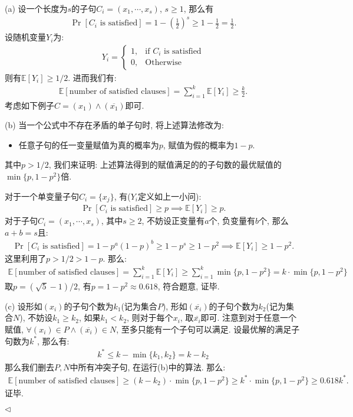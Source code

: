 \documentclass[11pt]{article}
\newenvironment{answer}[1][Solution]{\begin{trivlist}
\item[\hskip \labelsep{\bfseries#1.}\hskip \labelsep]}{\hfill$\lhd$\end{trivlist}}
\newcommand\E{\mathbb{E}}
\begin{document}
\begin{answer}
(a) 设一个长度为$s$的子句$C_i = (x_1,\cdots,x_s)$, $s\ge 1$, 那么有
\begin{align*}
    \Pr[C_i \text{ is satisfied}] = 1 - \left(\frac{1}{2}\right)^s \ge 1 - \frac{1}{2} = \frac{1}{2}.
\end{align*}
设随机变量$Y_i$为:
\begin{align*}
    Y_i = \begin{cases}
        1, & \text{if } C_i \text{ is satisfied} \\
        0, & \text{Otherwise}
    \end{cases}
\end{align*}
则有$\E[Y_i] \ge 1/2$. 进而我们有:
\begin{align*}
    \E[\text{number of satisfied clauses}] = \sum_{i=1}^k \E[Y_i] \ge \frac{k}{2}.
\end{align*}
考虑如下例子$C = (x_1)\land (\overline{x_1})$即可.

(b) 当一个公式中不存在矛盾的单子句时, 将上述算法修改为:
\begin{itemize}
    \item 任意子句的任一变量赋值为真的概率为$p$, 赋值为假的概率为$1-p$.
\end{itemize} 
其中$p > 1/2$, 我们来证明: 上述算法得到的赋值满足的的子句数的最优赋值的$\min\{p, 1-p^2\}$倍.

对于一个单变量子句$C_i = \{x_j\}$, 有($Y_i$定义如上一小问):
\begin{align*}
    \Pr[C_i \text{ is satisfied}] \ge p \implies \E[Y_i] \ge p.
\end{align*}
对于子句$C_i = (x_1,\cdots,x_s)$, 其中$s\ge 2$, 不妨设正变量有$a$个, 负变量有$b$个, 那么$a + b = s$且:
\begin{align*}
    \Pr[C_i \text{ is satisfied}] = 1 - p^a(1-p)^b \ge 1 - p^s \ge 1 - p^2 \implies \E[Y_i] \ge 1 - p^2.
\end{align*}
这里利用了$p > 1/2 > 1-p$. 那么:
\begin{align*}
    \E[\text{number of satisfied clauses}] = \sum_{i=1}^k \E[Y_i] \ge \sum_{i=1}^k \min\{p, 1-p^2\} = k\cdot \min\{p, 1-p^2\}
\end{align*}
取$ p = (\sqrt{5}-1)/2$,  有$p = 1-p^2 \approx 0.618$, 符合题意, 证毕.

(c) 设形如$(x_i)$的子句个数为$k_1$(记为集合$P$), 形如$(\overline{x_i})$的子句个数为$k_2$(记为集合$N$), 不妨设$k_1 \ge k_2$, 如果$k_1 < k_2$, 则对于每个$x_i$, 取$\overline{x_i}$即可. 注意到对于任意一个赋值, $\forall (x_i) \in P\land (\overline{x_i})\in N$, 至多只能有一个子句可以满足. 设最优解的满足子句数为$k^*$, 那么有:
\begin{align*}
    k^* \le k - \min\{k_1, k_2\} = k - k_2
\end{align*} 
那么我们删去$P,N$中所有冲突子句, 在运行(b)中的算法. 那么:
\begin{align*}
    \E[\text{number of satisfied clauses}] \ge (k-k_2)\cdot \min\{p, 1-p^2\} \ge k^*\cdot \min\{p, 1-p^2\} \ge 0.618k^*.
\end{align*}
证毕.


\end{answer}
\end{document}
